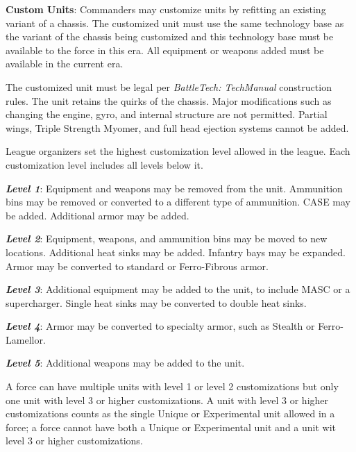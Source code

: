 \item {\bfseries Custom Units}: Commanders may customize units by refitting an existing variant of a chassis.
The customized unit must use the same technology base as the variant of the chassis being customized and this technology base must be available to the force in this era.
All equipment or weapons added must be available in the current era.

The customized unit must be legal per \emph{BattleTech: TechManual} construction rules.
The unit retains the quirks of the chassis.
Major modifications such as changing the engine, gyro, and internal structure are not permitted.
Partial wings, Triple Strength Myomer, and full head ejection systems cannot be added.

League organizers set the highest customization level allowed in the league.
Each customization level includes all levels below it.

\begin{description}

\item \emph{\bfseries Level 1}: Equipment and weapons may be removed from the unit.
Ammunition bins may be removed or converted to a different type of ammunition.
CASE may be added.
Additional armor may be added.

\item \emph{\bfseries Level 2}: Equipment, weapons, and ammunition bins may be moved to new locations.
Additional heat sinks may be added.
Infantry bays may be expanded.
Armor may be converted to standard or Ferro-Fibrous armor.

\item \emph{\bfseries Level 3}: Additional equipment may be added to the unit, to include MASC or a supercharger.
Single heat sinks may be converted to double heat sinks.

\item \emph{\bfseries Level 4}: Armor may be converted to specialty armor, such as Stealth or Ferro-Lamellor.

\item \emph{\bfseries Level 5}: Additional weapons may be added to the unit.

\end{description}

A force can have multiple units with level 1 or level 2 customizations but only one unit with level 3 or higher customizations.
A unit with level 3 or higher customizations counts as the single Unique or Experimental unit allowed in a force; a force cannot have both a Unique or Experimental unit and a unit wit level 3 or higher customizations.


